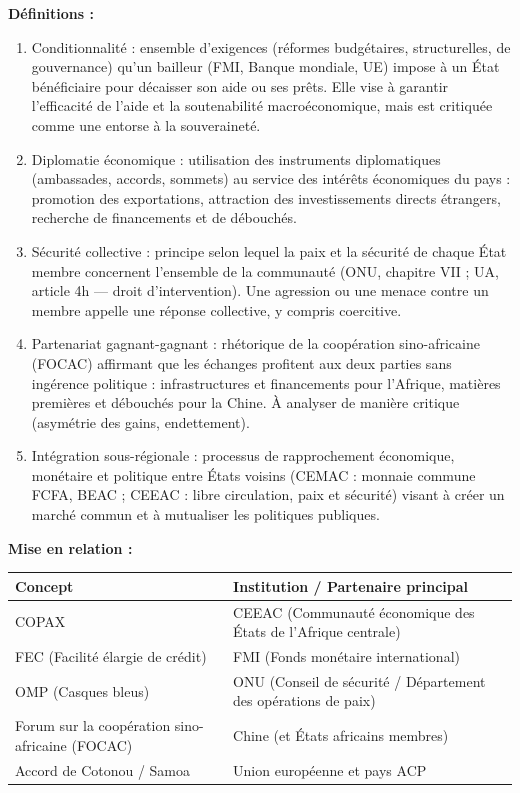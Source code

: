\documentclass[11pt]{article}
\newcommand{\cle}[1]{{\popxbold\color{popdark}#1}}
\begin{document}
\begin{corrige}
\textbf{Définitions :}
\begin{enumerate}
    \item \cle{Conditionnalité} : ensemble d'exigences (réformes budgétaires, structurelles, de gouvernance) qu'un bailleur (FMI, Banque mondiale, UE) impose à un État bénéficiaire pour décaisser son aide ou ses prêts. Elle vise à garantir l'efficacité de l'aide et la soutenabilité macroéconomique, mais est critiquée comme une entorse à la souveraineté.
    \item \cle{Diplomatie économique} : utilisation des instruments diplomatiques (ambassades, accords, sommets) au service des intérêts économiques du pays : promotion des exportations, attraction des investissements directs étrangers, recherche de financements et de débouchés.
    \item \cle{Sécurité collective} : principe selon lequel la paix et la sécurité de chaque État membre concernent l'ensemble de la communauté (ONU, chapitre VII ; UA, article 4h — droit d'intervention). Une agression ou une menace contre un membre appelle une réponse collective, y compris coercitive.
    \item \cle{Partenariat gagnant-gagnant} : rhétorique de la coopération sino-africaine (FOCAC) affirmant que les échanges profitent aux deux parties sans ingérence politique : infrastructures et financements pour l'Afrique, matières premières et débouchés pour la Chine. À analyser de manière critique (asymétrie des gains, endettement).
    \item \cle{Intégration sous-régionale} : processus de rapprochement économique, monétaire et politique entre États voisins (CEMAC : monnaie commune FCFA, BEAC ; CEEAC : libre circulation, paix et sécurité) visant à créer un marché commun et à mutualiser les politiques publiques.
\end{enumerate}
\textbf{Mise en relation :}
\begin{center}
\begin{tabularx}{\linewidth}{|l|X|}\hline
\rowcolor{popblueL}
\textbf{Concept} & \textbf{Institution / Partenaire principal} \\ \hline
COPAX & CEEAC (Communauté économique des États de l'Afrique centrale) \\ \hline
FEC (Facilité élargie de crédit) & FMI (Fonds monétaire international) \\ \hline
OMP (Casques bleus) & ONU (Conseil de sécurité / Département des opérations de paix) \\ \hline
Forum sur la coopération sino-africaine (FOCAC) & Chine (et États africains membres) \\ \hline
Accord de Cotonou / Samoa & Union européenne et pays ACP \\ \hline
\end{tabularx}
\end{center}
\end{corrige}
\end{document}
